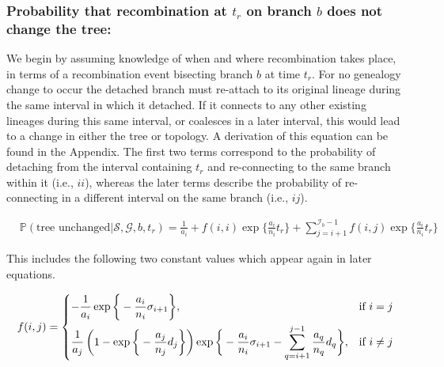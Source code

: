 \documentclass[11pt]{article}
\begin{document}
\subsubsection{Probability that recombination at $t_r$ on branch $b$ does not change the tree:}
We begin by assuming knowledge of when and where recombination takes place, in terms 
of a recombination event bisecting branch $b$ at time $t_r$. %
For no genealogy change to occur the detached branch must re-attach to its original 
lineage during the same interval in which it detached.
If it connects to any other existing lineages during this same interval, 
or coalesces in a later interval, this would lead to a change in either the 
tree or topology. A derivation of this equation can be found in the Appendix.
The first two terms correspond to the probability of detaching from the interval 
containing $t_r$ and re-connecting to the same branch within it (i.e., $ii$), 
whereas the later terms describe the probability of re-connecting in a different interval
on the same branch (i.e., $ij$).


\begin{equation}
\begin{aligned}
	&\mathbb{P}(\text{tree unchanged} | \mathcal{S},\mathcal{G},b,t_r) = 
	\frac{1}{a_i} + f(i,i) \exp \bigg\{\frac{a_i}{n_i}t_r\bigg\} +
	\sum_{j=i+1}^{\mathcal{I}_b - 1} f(i,j) \exp\bigg\{\frac{a_i}{n_i}t_r\bigg\} 
\end{aligned}
\end{equation}


\noindent This includes the following two constant values which appear again 
in later equations.

\begin{equation}
\begin{aligned}	
	f(i,j) = 
	\begin{dcases}
		- \frac{1}{a_i} \exp \bigg\{-\frac{a_i}{n_i}\sigma_{i + 1} \bigg\}, 
		& \text{if } i=j\\
		\frac{1}{a_j} \left(1 - \exp \bigg\{ -\frac{a_j}{n_j} d_j \bigg\} 
		\right)
		\exp \bigg\{ -\frac{a_i}{n_i}\sigma_{i+1} - 
		\sum_{q=i+1}^{j-1} \frac{a_q}{n_q} d_q \bigg \}, 
		& \text{if } i\ne j\\
	\end{dcases}
\end{aligned}
\end{equation}
\end{document}
